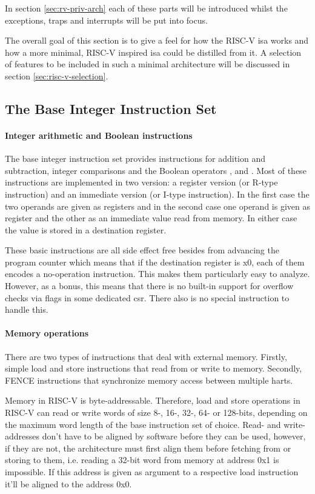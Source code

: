 In section \ref{sec:rv-priv-arch} each of these parts will be introduced whilst the exceptions, traps and interrupts will be put into focus.

The overall goal of this section is to give a feel for how the RISC-V \gls{isa} works and how a more minimal, RISC-V inspired \gls{isa} could be distilled from it.
A selection of features to be included in such a minimal architecture will be discussed in section \ref{sec:risc-v-selection}.

\subsection{The Base Integer Instruction Set}
\label{sec:rv-base-int-isa}

\paragraph{Integer arithmetic and Boolean instructions}
The base integer instruction set provides instructions for addition and subtraction, integer comparisons and the Boolean operators ,  and .
Most of these instructions are implemented in two version: a register version (or R-type instruction) and an immediate version (or I-type instruction).
In the first case the two operands are given as registers and in the second case one operand is given as register and the other as an immediate value read from memory.
In either case the value is stored in a destination register.

These basic instructions are all side effect free besides from advancing the program counter which means that if the destination register is x0, each of them encodes a no-operation instruction.
This makes them particularly easy to analyze.
However, as a bonus, this means that there is no built-in support for overflow checks via flags in some dedicated \gls{csr}.
There also is no special instruction to handle this.

\paragraph{Memory operations}
There are two types of instructions that deal with external memory.
Firstly, simple load and store instructions that read from or write to memory.
Secondly, FENCE instructions that synchronize memory access between multiple \glspl{hart}.

Memory in RISC-V is byte-addressable.
Therefore, load and store operations in RISC-V can read or write words of size 8-, 16-, 32-, 64- or 128-bits, depending on the maximum word length of the base instruction set of choice.
Read- and write-addresses don't have to be aligned by software before they can be used, however, if they are not, the architecture must first align them before fetching from or storing to them, i.e. reading a 32-bit word from memory at address 0x1 is impossible.
If this address is given as argument to a respective load instruction it'll be aligned to the address 0x0.

